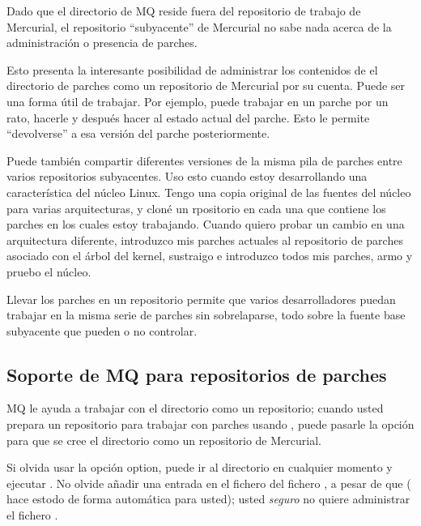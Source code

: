 Dado que el directorio  de MQ reside fuera del
repositorio de trabajo de Mercurial, el repositorio ``subyacente'' de
Mercurial no sabe nada acerca de la administración o presencia de
parches.

Esto presenta la interesante posibilidad de administrar los contenidos
de el directorio de parches como un repositorio de Mercurial por su
cuenta.  Puede ser una forma útil de trabajar.  Por ejemplo, puede
trabajar en un parche por un rato, hacerle  y
después hacer  al estado actual del parche.  Esto le
permite ``devolverse'' a esa versión del parche posteriormente.

Puede también compartir diferentes versiones de la misma pila de
parches entre varios repositorios subyacentes.  Uso esto cuando estoy
desarrollando una característica del núcleo Linux.  Tengo una copia
original de las fuentes del núcleo para varias arquitecturas, y cloné
un rpositorio en cada una que contiene los parches en los cuales
estoy trabajando.  Cuando quiero probar un cambio en una arquitectura
diferente, introduzco mis parches actuales al repositorio de parches
asociado con el árbol del kernel, sustraigo e introduzco todos mis
parches, armo y pruebo el núcleo.

Llevar los parches en un repositorio permite que varios
desarrolladores puedan trabajar en la misma serie de parches sin
sobrelaparse, todo sobre la fuente base subyacente que pueden o no
controlar.

\subsection{Soporte de MQ para repositorios de parches}

MQ le ayuda a trabajar con el directorio  como
un repositorio; cuando usted prepara un repositorio para trabajar con
parches usando , puede pasarle la opción
 para que se cree el directorio
 como un repositorio de Mercurial.

\begin{note}
  Si olvida usar la opción  option, puede ir al
  directorio  en cualquier momento y ejecutar
  .  No olvide añadir una entrada en el fichero
   del fichero , a pesar de que
  ( hace estodo de forma
  automática para usted); usted \emph{seguro} no quiere administrar el
  fichero  .
\end{note}

